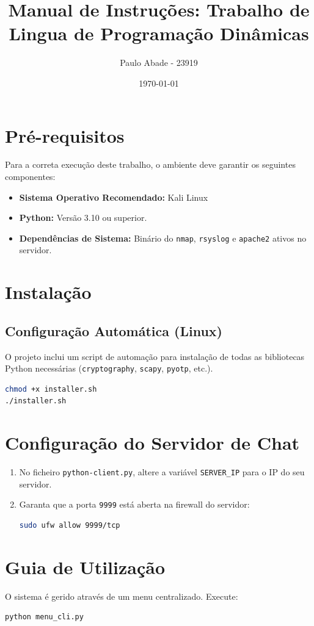 \documentclass[12pt,a4paper]{article}
\title{Manual de Instruções: Trabalho de Lingua de Programação Dinâmicas}
\author{Paulo Abade - 23919}
\date{\today}
\begin{document}
\maketitle

\section{Pré-requisitos}
Para a correta execução deste trabalho, o ambiente deve garantir os seguintes componentes:
\begin{itemize}
    \item \textbf{Sistema Operativo Recomendado:} Kali Linux
    \item \textbf{Python:} Versão 3.10 ou superior.
    \item \textbf{Dependências de Sistema:} Binário do \texttt{nmap}, \texttt{rsyslog} e \texttt{apache2} ativos no servidor.
\end{itemize}

\section{Instalação}
\subsection{Configuração Automática (Linux)}
O projeto inclui um script de automação para instalação de todas as bibliotecas Python necessárias (\texttt{cryptography}, \texttt{scapy}, \texttt{pyotp}, etc.).
\begin{lstlisting}[language=bash]
chmod +x installer.sh
./installer.sh
\end{lstlisting}


\section{Configuração do Servidor de Chat}
\begin{enumerate}
    \item No ficheiro \texttt{python-client.py}, altere a variável \texttt{SERVER\_IP} para o IP do seu servidor.
    \item Garanta que a porta \texttt{9999} está aberta na firewall do servidor:
    \begin{lstlisting}[language=bash]
    sudo ufw allow 9999/tcp
    \end{lstlisting}
\end{enumerate}

\section{Guia de Utilização}
O sistema é gerido através de um menu centralizado. Execute:
\begin{lstlisting}[language=bash]
python menu_cli.py
\end{lstlisting}
\end{document}
